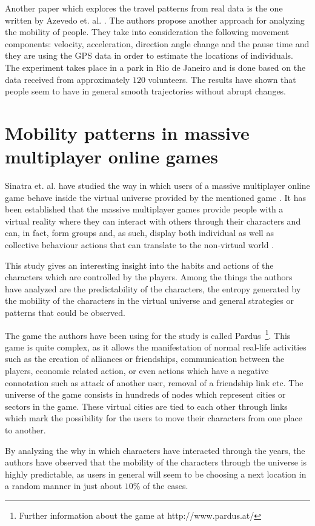 Another paper which explores the travel patterns from real data is the one
written by Azevedo et. al. \cite{Azevedo09}. The authors propose another
approach for analyzing the mobility of people. They take into consideration the
following movement components: velocity, acceleration, direction angle change
and the pause time and they are using the GPS data in order to estimate the
locations of individuals. The experiment takes place in a park in Rio de Janeiro
and is done based on the data received from approximately $120$ volunteers. The
results have shown that people seem to have in general smooth trajectories without
abrupt changes.

\section{Mobility patterns in massive multiplayer online games}
Sinatra et. al. have studied the way in which users of a massive multiplayer
online game behave inside the virtual universe provided by the mentioned game
\cite{Sinatra14}. It has been established that the massive multiplayer games
provide people with a virtual reality where they can interact with others
through their characters and can, in fact, form groups and, as such, display
both individual as well as collective behaviour actions that can translate to
the non-virtual world \cite{Ball03}.

This study gives an interesting insight into the habits and actions of the
characters which are controlled by the players. Among the things the authors
have analyzed are the predictability of the characters, the entropy generated by
the mobility of the characters in the virtual universe and general strategies or
patterns that could be observed.

The game the authors have been using for the study is called
Pardus~\footnote{Further information about the game at http://www.pardus.at/}.
This game is quite complex, as it allows the manifestation of normal real-life
activities such as the creation of alliances or friendships, communication
between the players, economic related action, or even actions which have a
negative connotation such as attack of another user, removal of a friendship
link etc. The universe of the game consists in hundreds of nodes which represent
cities or sectors in the game. These virtual cities are tied to each other
through links which mark the possibility for the users to move their characters
from one place to another.

By analyzing the why in which characters have interacted through the years, the
authors have observed that the mobility of the characters through the universe
is highly predictable, as users in general will seem to be choosing a next
location in a random manner in just about $10\%$ of the cases.

